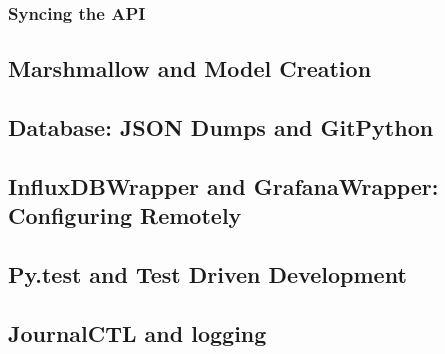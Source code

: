 \subsubsection{Syncing the API }
\subsection{Marshmallow and Model Creation  }\label{subsection:marshmallow}

\subsection{Database: JSON Dumps and GitPython}

\subsection{InfluxDBWrapper and GrafanaWrapper: Configuring Remotely}

\subsection{Py.test and Test Driven Development}

\subsection{JournalCTL and logging}